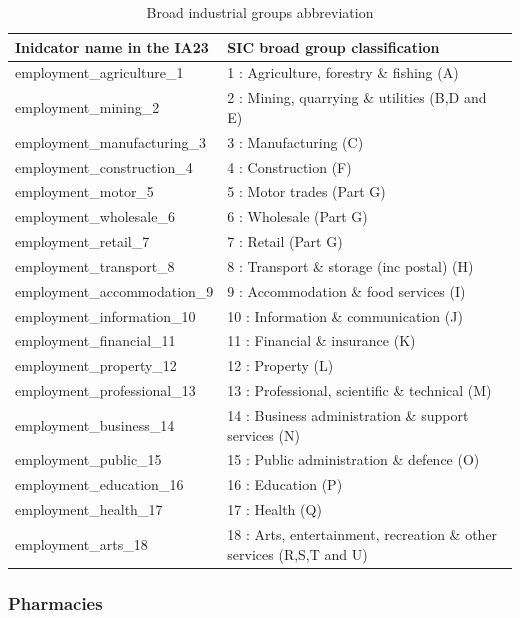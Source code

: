 \documentclass{article}
\begin{document}
\begin{table}[!h]

\caption{\label{tab:unnamed-chunk-3}Broad industrial groups abbreviation}
\centering
\begin{tabu} to 
\toprule
Inidcator name in the IA23 & SIC broad group classification\\
\midrule
employment\_agriculture\_1 & 1 : Agriculture, forestry \& fishing (A)\\
employment\_mining\_2 & 2 : Mining, quarrying \& utilities (B,D and E)\\
employment\_manufacturing\_3 & 3 : Manufacturing (C)\\
employment\_construction\_4 & 4 : Construction (F)\\
employment\_motor\_5 & 5 : Motor trades (Part G)\\
\addlinespace
employment\_wholesale\_6 & 6 : Wholesale (Part G)\\
employment\_retail\_7 & 7 : Retail (Part G)\\
employment\_transport\_8 & 8 : Transport \& storage (inc postal) (H)\\
employment\_accommodation\_9 & 9 : Accommodation \& food services (I)\\
employment\_information\_10 & 10 : Information \& communication (J)\\
\addlinespace
employment\_financial\_11 & 11 : Financial \& insurance (K)\\
employment\_property\_12 & 12 : Property (L)\\
employment\_professional\_13 & 13 : Professional, scientific \& technical (M)\\
employment\_business\_14 & 14 : Business administration \& support services (N)\\
employment\_public\_15 & 15 : Public administration \& defence (O)\\
\addlinespace
employment\_education\_16 & 16 : Education (P)\\
employment\_health\_17 & 17 : Health (Q)\\
employment\_arts\_18 & 18 : Arts, entertainment, recreation \& other services (R,S,T and U)\\
\bottomrule
\end{tabu}
\end{table}

\hypertarget{pharmacies}{%
\subsubsection{Pharmacies}\label{pharmacies}}
\end{document}
